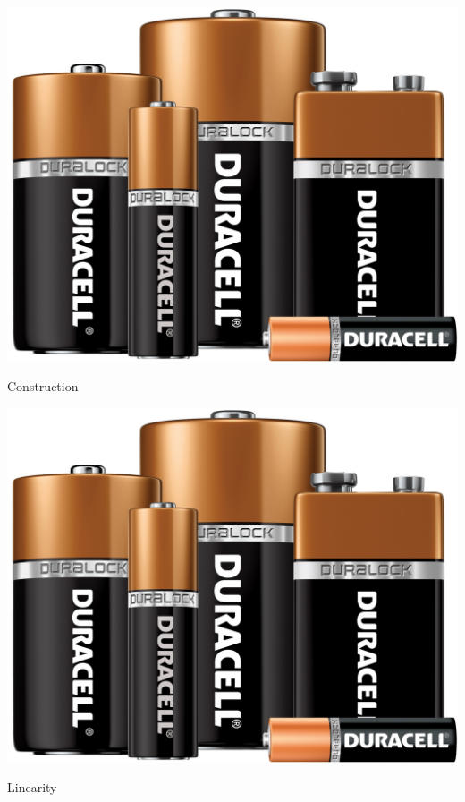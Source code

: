 \documentclass{brochure}
\begin{document}
\begin{brochure}
\begin{page}

\lipsum[25]

\lipsum[55]
		\begingroup
		\begin{center}
				\includegraphics[width=.75\linewidth]{lunch}
				\end{center}
		\endgroup

\vspace{-11pt}
\lipsum[75]
		\vspace{11pt}
		\begin{infoBox}{Construction}
			\lipsum[8]
		\end{infoBox}

\end{page}


\begin{lastpage}
		\begingroup
				\begin{center}
				\includegraphics[width=\linewidth]{lunch}
				\label{fig:noisePlot}
				\end{center}
		\endgroup
		\begin{infoBox}{Linearity}
			\lipsum[8]
		\end{infoBox}


\end{lastpage}
\end{brochure}
\end{document}
